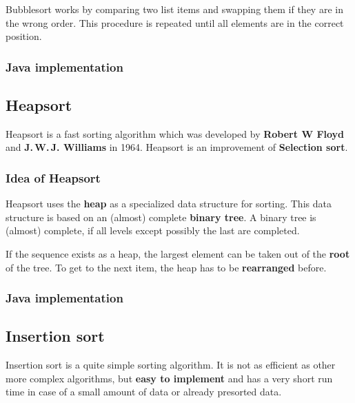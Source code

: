 \documentclass[11pt, a4paper, titlepage, twoside]{article}
\renewcommand{\emph}{\textbf}
\begin{document}
	Bubblesort works by comparing two list items and swapping them if they are in the wrong order. This procedure is repeated until all elements are in the correct position.
	
	\subsubsection{Java implementation}
	
	
	
	\subsection{Heapsort}
	
	Heapsort is a fast sorting algorithm which was developed by \emph{Robert W Floyd} and \emph{J.\,W.\,J. Williams} in 1964. Heapsort is an improvement of \emph{Selection sort}.
	
	\subsubsection{Idea of Heapsort}
	
	Heapsort uses the \emph{heap} as a specialized data structure for sorting. This data structure is based on an (almost) complete \emph{binary tree}. A binary tree is (almost) complete, if all levels except possibly the last are completed.
	
	If the sequence exists as a heap, the largest element can be taken out of the \emph{root} of the tree. To get to the next item, the heap has to be \emph{rearranged} before.
	
	\subsubsection{Java implementation}
	
	
	
	\subsection{Insertion sort}
	
	Insertion sort is a quite simple sorting algorithm. It is not as efficient as other more complex algorithms, but \emph{easy to implement} and has a very short run time in case of a small amount of data or already presorted data.
	
\end{document}
